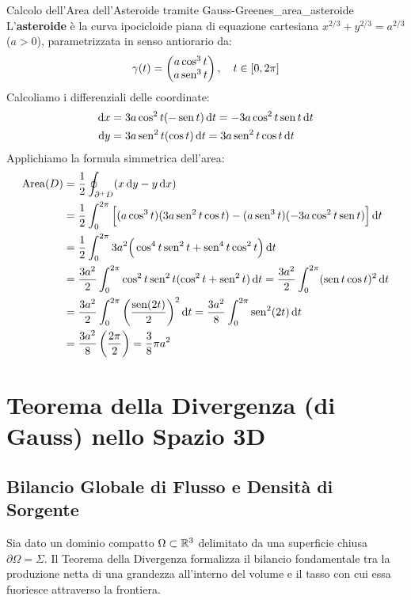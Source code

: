 \begin{esempio}{Calcolo dell'Area dell'Asteroide tramite Gauss-Green}{es_area_asteroide}
L'\textbf{asteroide} è la curva ipocicloide piana di equazione cartesiana $x^{2/3} + y^{2/3} = a^{2/3}$ ($a > 0$), parametrizzata in senso antiorario da:
\[
\gamma(t) = \begin{pmatrix} a \cos^3 t \\ a \operatorname{sen}^3 t \end{pmatrix}, \quad t \in [0, 2\pi]
\]
Calcoliamo i differenziali delle coordinate:
\begin{align*}
\mathop{}\!\mathrm{d} x &= 3a \cos^2 t (-\operatorname{sen} t) \mathop{}\!\mathrm{d} t = -3a \cos^2 t \operatorname{sen} t \mathop{}\!\mathrm{d} t \\
\mathop{}\!\mathrm{d} y &= 3a \operatorname{sen}^2 t (\cos t) \mathop{}\!\mathrm{d} t = 3a \operatorname{sen}^2 t \cos t \mathop{}\!\mathrm{d} t
\end{align*}
Applichiamo la formula simmetrica dell'area:
\begin{align*}
\operatorname{Area}(D) &= \frac{1}{2} \oint_{\partial^+ D} (x \dy - y \dx) \\
&= \frac{1}{2} \int_{0}^{2\pi} \Big[ (a \cos^3 t)(3a \sen^2 t \cos t) - (a \sen^3 t)(-3a \cos^2 t \sen t) \Big] \dt \\
&= \frac{1}{2} \int_{0}^{2\pi} 3a^2 \Big( \cos^4 t \sen^2 t + \sen^4 t \cos^2 t \Big) \dt \\
&= \frac{3a^2}{2} \int_{0}^{2\pi} \cos^2 t \sen^2 t (\cos^2 t + \sen^2 t) \dt = \frac{3a^2}{2} \int_{0}^{2\pi} (\sen t \cos t)^2 \dt \\
&= \frac{3a^2}{2} \int_{0}^{2\pi} \left( \frac{\sen(2t)}{2} \right)^2 \dt = \frac{3a^2}{8} \int_{0}^{2\pi} \sen^2(2t) \dt \\
&= \frac{3a^2}{8} \left( \frac{2\pi}{2} \right) = \frac{3}{8}\pi a^2
\end{align*}
\end{esempio}

\section{Teorema della Divergenza (di Gauss) nello Spazio 3D}

\subsection{Bilancio Globale di Flusso e Densità di Sorgente}

Sia dato un dominio compatto $\Omega \subset \mathbb{R}^3$ delimitato da una superficie chiusa $\partial \Omega = \Sigma$. Il Teorema della Divergenza formalizza il bilancio fondamentale tra la produzione netta di una grandezza all'interno del volume e il tasso con cui essa fuoriesce attraverso la frontiera.

